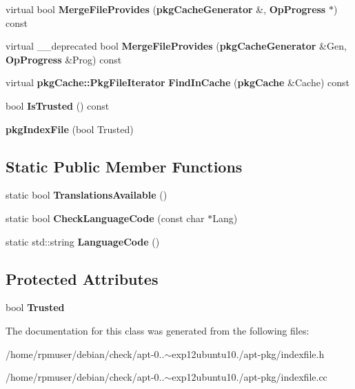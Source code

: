 \begin{DoxyCompactItemize}
\item 
virtual bool {\bfseries \-Merge\-File\-Provides} ({\bf pkg\-Cache\-Generator} \&, {\bf \-Op\-Progress} $\ast$) const \label{classpkgIndexFile_aec43459b9d8e480b4cb3629e807c265f}

\item 
virtual \-\_\-\-\_\-deprecated bool {\bfseries \-Merge\-File\-Provides} ({\bf pkg\-Cache\-Generator} \&\-Gen, {\bf \-Op\-Progress} \&\-Prog) const \label{classpkgIndexFile_a081a7bb202d88763196f3b7757bdf322}

\item 
virtual {\bf pkg\-Cache\-::\-Pkg\-File\-Iterator} {\bfseries \-Find\-In\-Cache} ({\bf pkg\-Cache} \&\-Cache) const \label{classpkgIndexFile_afa0e20f879d9090dac2a7a4830bc7015}

\item 
bool {\bfseries \-Is\-Trusted} () const \label{classpkgIndexFile_aff34485f3c8499f45169fc6ab7e39409}

\item 
{\bfseries pkg\-Index\-File} (bool \-Trusted)\label{classpkgIndexFile_a79738449550662cc0521dc9961a0ae83}

\end{DoxyCompactItemize}
\subsection*{\-Static \-Public \-Member \-Functions}
\begin{DoxyCompactItemize}
\item 
static bool {\bfseries \-Translations\-Available} ()\label{classpkgIndexFile_ac6d61f91a133ebc6ab5a5d6fc56a0629}

\item 
static bool {\bfseries \-Check\-Language\-Code} (const char $\ast$\-Lang)\label{classpkgIndexFile_aeed442847df5cbe81c98e44a57146bfe}

\item 
static std\-::string {\bfseries \-Language\-Code} ()\label{classpkgIndexFile_acfe90c5fa9863991c73bc6a6820cf5de}

\end{DoxyCompactItemize}
\subsection*{\-Protected \-Attributes}
\begin{DoxyCompactItemize}
\item 
bool {\bfseries \-Trusted}\label{classpkgIndexFile_a224b67941df4d54b46be8dd05390428f}

\end{DoxyCompactItemize}


\-The documentation for this class was generated from the following files\-:\begin{DoxyCompactItemize}
\item 
/home/rpmuser/debian/check/apt-\/0..$\sim$exp12ubuntu10./apt-\/pkg/indexfile.\-h\item 
/home/rpmuser/debian/check/apt-\/0..$\sim$exp12ubuntu10./apt-\/pkg/indexfile.\-cc\end{DoxyCompactItemize}
